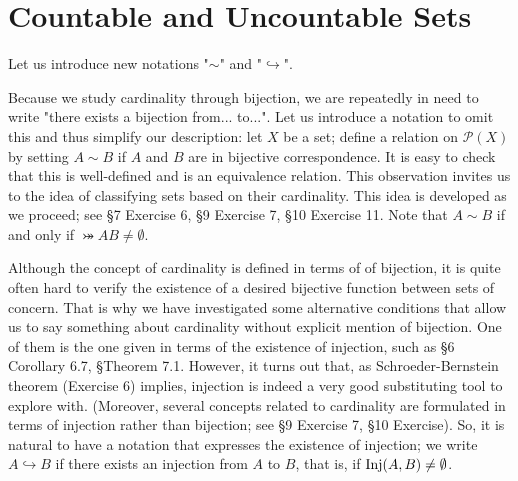 \documentclass[a4paper,12pt]{article}
\begin{document}
\section{Countable and Uncountable Sets}
\setcounter{exe}{0}
Let us introduce new notations "\( \sim \)" and "\( \hookrightarrow \)".

Because we study cardinality through bijection,
we are repeatedly in need to write "there exists a bijection from...\! to...".
Let us introduce a notation to omit this and thus simplify our description:
let \( X \) be a set; define a relation on \( \mathcal{P}(X) \) by setting
\( A \sim B \) if \( A \) and \( B \) are in bijective correspondence.
It is easy to check that this is well-defined and is an equivalence relation.
This observation invites us to the idea of classifying sets based on their cardinality.
This idea is developed as we proceed;
see \S7 Exercise 6, \S9 Exercise 7, \S10 Exercise 11.
Note that \( A \sim B \) if and only if \( \bij{A}{B} \neq \emptyset \).

Although the concept of cardinality is defined in terms of of bijection,
it is quite often hard to verify the existence of a desired bijective function between sets of concern.
That is why we have investigated some alternative conditions that allow us to say something about cardinality without explicit mention of bijection.
One of them is the one given in terms of the existence of injection, such as \S6 Corollary 6.7, \S Theorem 7.1.
However, it turns out that, as Schroeder-Bernstein theorem (Exercise 6) implies,
injection is indeed a very good substituting tool to explore with.
(Moreover, several concepts related to cardinality are formulated in terms of injection rather than bijection; see \S9 Exercise 7, \S10 Exercise).
So, it is natural to have a notation that expresses the existence of injection;
we write \( A \hookrightarrow B \) if there exists an injection from \( A \) to \( B \),
that is, if \( \mathrm{Inj}(A,B)\neq \emptyset \).
\end{document}

